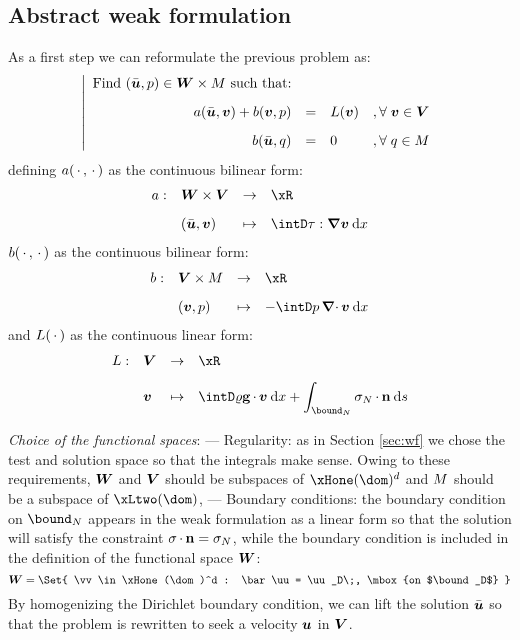 \subsection{Abstract weak formulation}

As a first step we can reformulate the previous problem as:
\begin{equation*}
\left\vert
\begin{array}{rlll}
\mbox{Find $(\bar{{{\boldsymbol u}}},p)\in \boldsymbol{\boldsymbol{W}}\times{M}$ such that:}\\[2ex]
\displaystyle a(\bar{{{\boldsymbol u}}},{{\boldsymbol v}}) + b({{\boldsymbol v}}, p) &=& L({{\boldsymbol v}})& ,{\forall\;}{{\boldsymbol v}}\in\boldsymbol{{V}}\\[2ex]
\displaystyle b(\bar{{{\boldsymbol u}}},q) &=& 0 & ,{\forall\;} q\in{M}
\end{array}
\right.
\end{equation*}
defining $a(\,{\mathbf\cdot}\,,\,{\mathbf\cdot}\,)$ as the continuous bilinear form:
\begin{equation*}
\begin{array}{rlll}
a :& \xWd\times\xVd & \fromto & \xR \\[2ex]
   & (\bar\uu,\vv)      & \mapsto & \displaystyle \intD \Tvisc:\Grad\vv\dx
\end{array}
\end{equation*}
$b(\,{\mathbf\cdot}\,,\,{\mathbf\cdot}\,)$ as the continuous bilinear form:
\begin{equation*}
\begin{array}{rlll}
b :& \xVd\times\xM  & \fromto & \xR \\[2ex]
   & (\vv , p)      & \mapsto & \displaystyle - \intD p\,\Div\vv\dx
\end{array}
\end{equation*}
and $L(\,{\mathbf\cdot}\,)$ as the continuous linear form:
\begin{equation*}
\begin{array}{rlll}
L :& \xVd   & \fromto & \xR \\[2ex]
   & \vv    & \mapsto & \displaystyle \displaystyle\intD \dens\grav\xDot\vv\dx + \int_{\bound_N}\Stress_N\xDot\n\ds
\end{array}
\end{equation*}

\medskip
\textit{Choice of the functional spaces}:
--- Regularity: as in Section \ref{sec:wf} we chose the test and solution space so that the integrals make sense.
Owing to these requirements, $\boldsymbol{\boldsymbol{W}}$ and $\boldsymbol{{V}}$ should be subspaces of $\xHone(\dom)^d$ and ${M}$ should be a subspace of $\xLtwo(\dom)$,
--- Boundary conditions: the boundary condition on $\bound_N$ appears in the weak formulation as a linear form so that the solution will satisfy the constraint $\sigma\,{\mathbf\cdot}\,\mathbf n = \sigma_N$, while the boundary condition is included in the definition of the functional space $\boldsymbol{\boldsymbol{W}}$:
\begin{equation*}
\xWd = \Set{ \vv \in \xHone(\dom)^d : \bar\uu = \uu_D\;, \mbox{on $\bound_D$} }
\end{equation*}
By homogenizing the Dirichlet boundary condition, we can lift the solution $\bar{{{\boldsymbol u}}}$ so that the problem is rewritten to seek a velocity ${{\boldsymbol u}}$ in $\boldsymbol{{V}}$.

